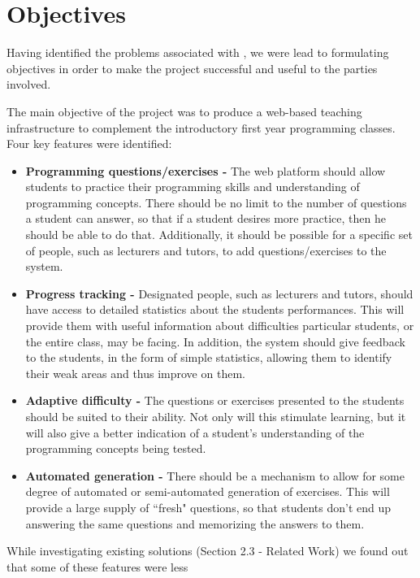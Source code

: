\documentclass[11pt,a4paper]{report}
\begin{document}
\section{Objectives}
Having identified the problems associated with , we were lead to formulating objectives in order to make the project successful and useful to the parties involved. \newline

The main objective of the project was to produce a web-based teaching infrastructure to complement the introductory first year programming classes. Four key features were identified:

\begin{itemize}
\item \textbf{Programming questions/exercises -} The web platform should allow students to practice their programming skills and understanding of programming concepts. There should be no limit to the number of questions a student can answer, so that if a student desires more practice, then he should be able to do that. Additionally, it should be possible for a specific set of people, such as lecturers and tutors, to add questions/exercises to the system.
\item \textbf{Progress tracking -} Designated people, such as lecturers and tutors, should have access to detailed statistics about the students performances. This will provide them with useful information about difficulties particular students, or the entire class, may be facing. In addition, the system should give feedback to the students, in the form of simple statistics, allowing them to identify their weak areas and thus improve on them.
\item \textbf{Adaptive difficulty -} The questions or exercises presented to the students should be suited to their ability. Not only will this stimulate learning, but it will also give a better indication of a student's understanding of the programming concepts being tested.
\item \textbf{Automated generation -} There should be a mechanism to allow for some degree of automated or semi-automated generation of exercises. This will provide a large supply of ``fresh" questions, so that students don't end up answering the same questions and memorizing the answers to them.
\end{itemize}

While investigating existing solutions (Section 2.3 - Related Work) we found out that some of these features were less
\end{document}

